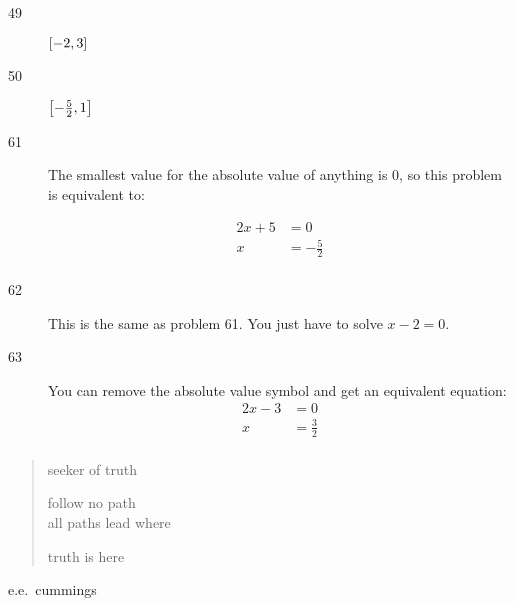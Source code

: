 \documentclass[letterpaper]{exam}
\begin{document}
\begin{description}
      \item[49] $ \intcc{ -2, 3 } $

      \item[50] $ \intcc{ - \frac{5}{2}, 1 } $

      \item[61] The smallest value for the absolute value of anything is 0, so
        this problem is equivalent to:

        \begin{align*}
          2x + 5 & = 0 \\
          x      & = - \frac{5}{2} \\
        \end{align*}

      \item[62] This is the same as problem 61. You just have to solve $x - 2 = 0$.

      \item[63] You can remove the absolute value symbol and get an equivalent equation:
        \begin{align*}
          2x - 3 & = 0 \\
          x      & = \frac{3}{2} \\
        \end{align*}

    \end{description}
  \fi

  \ifprintanswers{}
  \else
    \vspace{10 cm}

    \begin{verse}
      seeker of truth

      follow no path \\
      all paths lead where

      truth is here 
    \end{verse}
    \hspace{1 in} e.e.\ cummings

  \fi
\end{document}
